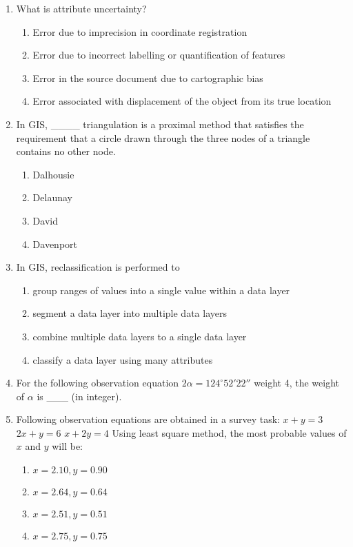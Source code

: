 \documentclass[12pt,a4paper]{article}
\begin{document}
\begin{enumerate}
\item What is attribute uncertainty?
\begin{enumerate}
    \item Error due to imprecision in coordinate registration
    \item Error due to incorrect labelling or quantification of features
    \item Error in the source document due to cartographic bias
    \item Error associated with displacement of the object from its true location
\end{enumerate}

\item In GIS, \_\_\_\_ triangulation is a proximal method that satisfies the requirement that a circle drawn through the three nodes of a triangle contains no other node.
\begin{enumerate}
    \item Dalhousie
    \item Delaunay
    \item David
    \item Davenport
\end{enumerate}

\item In GIS, reclassification is performed to
\begin{enumerate}
    \item group ranges of values into a single value within a data layer
    \item segment a data layer into multiple data layers
    \item combine multiple data layers to a single data layer
    \item classify a data layer using many attributes
\end{enumerate}

\item For the following observation equation $2\alpha = 124^\circ 52' 22''$ weight 4, the weight of $\alpha$ is \_\_\_ (in integer).

\item Following observation equations are obtained in a survey task:  
$x + y = 3$  
$2x + y = 6$  
$x + 2y = 4$  
Using least square method, the most probable values of $x$ and $y$ will be:
\begin{enumerate}
    \item $x = 2.10, y = 0.90$
    \item $x = 2.64, y = 0.64$
    \item $x = 2.51, y = 0.51$
    \item $x = 2.75, y = 0.75$
\end{enumerate}


\end{enumerate}
\end{document}
